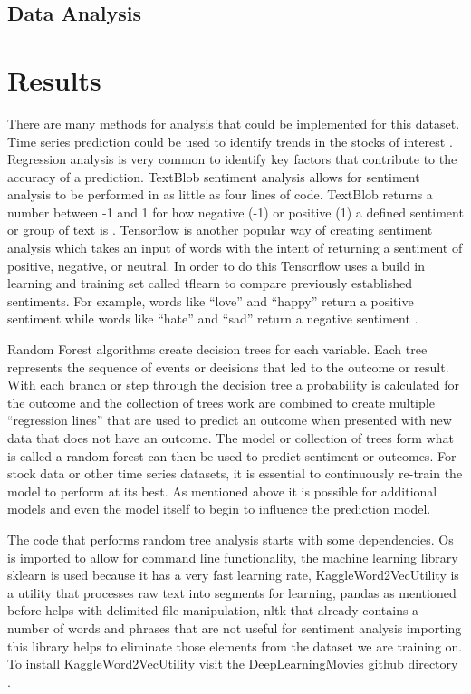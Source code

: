 \documentclass[sigconf]{acmart}
\begin{document}
\subsection{Data Analysis}



\section{Results}
There are many methods for analysis that could be implemented for this dataset. Time series prediction could be used to identify trends in the stocks of interest \cite{ARMANO}. Regression analysis is very common to identify key factors that contribute to the accuracy of a  prediction. TextBlob sentiment analysis allows for sentiment analysis to be performed in as little as four lines of code. TextBlob returns a number between -1 and 1 for how negative (-1) or positive (1) a defined sentiment or group of text is \cite{www-textblob}. Tensorflow is another popular way of creating sentiment analysis which takes an input of words with the intent of returning a sentiment of positive, negative, or neutral. In order to do this Tensorflow uses a build in learning and training set called tflearn to compare previously established sentiments. For example, words like ``love'' and ``happy'' return a positive sentiment while words like ``hate'' and ``sad'' return a negative sentiment \cite{www-oreilyTensor}. 

Random Forest algorithms create decision trees for each variable. Each tree represents the sequence of events or decisions that led to the outcome or result. With each branch or step through the decision tree a probability is calculated for the outcome and the collection of trees work are combined to create multiple ``regression lines'' that are used to predict an outcome when presented with new data that does not have an outcome. The model or collection of trees form what is called a random forest can then be used to predict sentiment or outcomes. For stock data or other time series datasets, it is essential to continuously re-train the model to perform at its best. As mentioned above it is possible for additional models and even the model itself to begin to influence the prediction model. 

The code that performs random tree analysis starts with some dependencies. Os is imported to allow for command line functionality, the machine learning library sklearn is used because it has a very fast learning rate, KaggleWord2VecUtility is a utility that processes raw text into segments for learning, pandas as mentioned before helps with delimited file manipulation, nltk that already contains a number of words and phrases that are not useful for sentiment analysis importing this library helps to eliminate those elements from the dataset we are training on. To install KaggleWord2VecUtility visit the DeepLearningMovies github directory \cite{kaggle}. 
\end{document}
